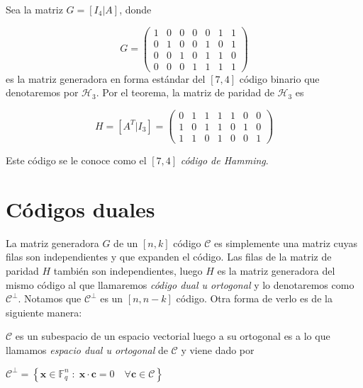 \begin{exampleth}
 \label{ex:matriz_generadora}
Sea la matriz $G = \left[I_4 | A\right]$, donde

\[
G = \left( \begin{array}{cccc|ccc}
	1 & 0 & 0 & 0 & 0 & 1 & 1 \\
	0 & 1 & 0 & 0 & 1 & 0 & 1 \\
	0 & 0 & 1 & 0 & 1 & 1 & 0 \\
	0 & 0 & 0 & 1 & 1 & 1 & 1 
			\end{array} 
	\right)
\]
es la matriz generadora en forma estándar del $\left[7,4\right]$ código binario que denotaremos por $\mathcal{H}_3$.
Por el teorema, la matriz de paridad de $\mathcal{H}_3$ es

\[
H =  \left[A^T | I_3\right] = \left( \begin{array}{cccc|ccc}
	0 & 1 & 1 & 1 & 1 & 0 & 0 \\
	1 & 0 & 1 & 1 & 0 & 1 & 0 \\
	1 & 1 & 0 & 1 & 0 & 0 & 1 

			\end{array} 
	\right)
\]

Este código se le conoce como el $\left[7,4\right]$ \emph{código de Hamming}.
\end{exampleth}

\section{Códigos duales}
La matriz generadora $G$ de un $\left[n,k\right]$ código $\mathcal{C}$  es simplemente una matriz cuyas filas son independientes y que expanden el código. Las filas de la matriz de paridad $H$ también son independientes, luego $H$ es la matriz generadora del mismo código al que llamaremos \textit{código dual u ortogonal} y lo denotaremos como $\mathcal{C}^\perp$. Notamos que $\mathcal{C}^\perp$ es un $\left[n,n-k\right]$ código. Otra forma de verlo es de la siguiente manera: \\


\begin{definition}
$\mathcal{C}$ es un subespacio de un espacio vectorial luego a su ortogonal es a lo que llamamos \textit{espacio dual u ortogonal} de $\mathcal{C}$ y viene dado por

$\mathcal{C}^\perp = \left\{ \textbf{x} \in \mathbb{F}_q^n \; : \; \textbf{x} \cdot \textbf{c} = 0 \quad  \forall \textbf{c} \in \mathcal{C} \right\}$
\end{definition}

